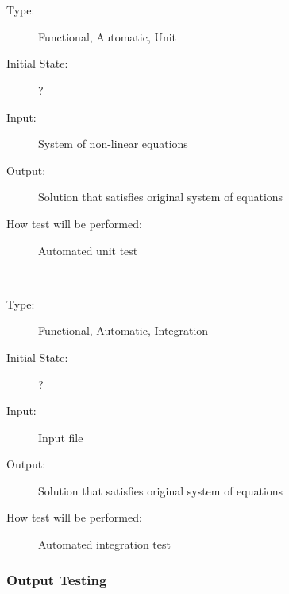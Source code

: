 \documentclass[12pt, titlepage]{article}
\newcounter{testnum} %
\begin{document}
\\
\begin{addmargin}[2em]{0em}
\\
\begin{addmargin}[2em]{0em}
\begin{description}
\item[Type:] Functional, Automatic, Unit
					
\item[Initial State:] ?
					
\item[Input:] System of non-linear equations
					
\item[Output:] Solution that satisfies original system of equations
					
\item[How test will be performed:] Automated unit test\\
\end{description}
\end{addmargin}

\\
\begin{addmargin}[2em]{0em}
\begin{description}
\item[Type:] Functional, Automatic, Integration
					
\item[Initial State:] ?
					
\item[Input:] Input file
					
\item[Output:] Solution that satisfies original system of equations
					
\item[How test will be performed:] Automated integration test\\
\end{description}
\end{addmargin}
\end{addmargin}

\subsubsection{Output Testing}
\end{document}
